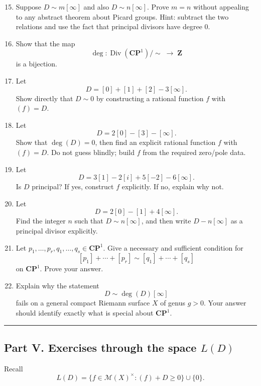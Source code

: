 \documentclass[11pt,openany]{article}
\begin{document}
\begin{enumerate}
	\setcounter{enumi}{14}
	
	\item Suppose \(D\sim m[\infty]\) and also \(D\sim n[\infty]\). Prove \(m=n\) without appealing to any abstract theorem about Picard groups.  
	Hint: subtract the two relations and use the fact that principal divisors have degree \(0\).
	
	\item Show that the map
	\[
	\deg:\operatorname{Div}(\mathbf{CP}^1)/\sim \;\longrightarrow\; \mathbf{Z}
	\]
	is a bijection.
	
	\item Let
	\[
	D=[0]+[1]+[2]-3[\infty].
	\]
	Show directly that \(D\sim 0\) by constructing a rational function \(f\) with \((f)=D\).
	
	\item Let
	\[
	D=2[0]-[3]-[\infty].
	\]
	Show that \(\deg(D)=0\), then find an explicit rational function \(f\) with \((f)=D\).  
	Do not guess blindly; build \(f\) from the required zero/pole data.
	
	\item Let
	\[
	D=3[1]-2[i]+5[-2]-6[\infty].
	\]
	Is \(D\) principal? If yes, construct \(f\) explicitly. If no, explain why not.
	
	\item Let
	\[
	D=2[0]-[1]+4[\infty].
	\]
	Find the integer \(n\) such that \(D\sim n[\infty]\), and then write \(D-n[\infty]\) as a principal divisor explicitly.
	
	\item Let \(p_1,\dots,p_r,q_1,\dots,q_s\in \mathbf{CP}^1\). Give a necessary and sufficient condition for
	\[
	[p_1]+\cdots+[p_r]\sim [q_1]+\cdots+[q_s]
	\]
	on \(\mathbf{CP}^1\). Prove your answer.
	
	\item Explain why the statement
	\[
	D\sim \deg(D)[\infty]
	\]
	fails on a general compact Riemann surface \(X\) of genus \(g>0\).  
	Your answer should identify exactly what is special about \(\mathbf{CP}^1\).
\end{enumerate}

\bigskip
\hrule
\bigskip

\subsection*{Part V. Exercises through the space \texorpdfstring{$L(D)$}{L(D)}}

Recall
\[
L(D)=\{f\in \mathcal{M}(X)^\times : (f)+D\ge 0\}\cup\{0\}.
\]
\end{document}
